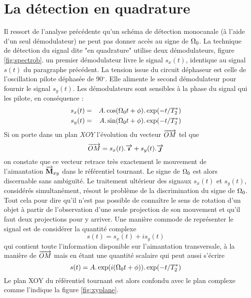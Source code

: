 \section{La détection en quadrature}
Il ressort de l'analyse précédente qu'un schéma de détection monocanale (à
l'aide d'un seul démodulateur) ne peut pas donner accès au signe de $\Omega_0$.
La technique de détection du signal dite "en quadrature" utilise deux démodulateurs, 
figure \ref{fig:spectrob}.
un premier démodulateur livre le signal $s_x(t)$, 
identique au signal $s(t)$ du paragraphe précédent.
La tension issue du circuit déphaseur est celle de l'oscillation pilote déphasée de 90$^{\circ}$.
Elle alimente le second démodulateur pour fournir le signal $s_y(t)$.
Les démodulateurs sont sensibles à la phase du signal qui les pilote, en conséquence :
\begin{eqnarray}
s_x(t) & = & A . \cos(\Omega_0 t + \phi) . \exp(-t/T_2^*) \\
s_y(t) & = & A . \sin(\Omega_0 t + \phi) . \exp(-t/T_2^*)
\end{eqnarray}
Si on porte dans un plan $XOY$ l'évolution du vecteur $\overrightarrow{OM}$ tel que
\begin{equation}
\overrightarrow{OM} = s_x(t) . \overrightarrow{\boldsymbol{\imath}} + s_y(t) . \overrightarrow{\boldsymbol{\jmath}}
\end{equation}
on constate que ce vecteur retrace très exactement le mouvement de l'aimantation $\overrightarrow{\mathbf{M}}_{xy}$
dans le référentiel tournant.
Le signe de $\Omega_0$ est alors discernable sans ambiguïté.
Le traitement ultérieur des signaux $s_x(t)$ et $s_y(t)$, considérés simultanément, résout le
problème de la discrimination du signe de $\Omega_0$.
Tout cela pour dire qu'il n'est pas possible de connaître le sens de rotation d'un objet
à partir de l'observation d'une seule projection de son mouvement et qu'il faut
deux projections pour y arriver.
Une manière commode de représenter le signal est de considérer la quantité complexe
\begin{equation}
s(t) = s_x(t) + is_y(t)
\end{equation}
qui contient toute l'information disponible sur l'aimantation transversale, à la
manière de $\overrightarrow{OM}$ mais en étant une quantité scalaire qui peut aussi s'écrire
\begin{equation}
\label{signalcomplexe}
s(t) = A . \exp(i(\Omega_0 t + \phi)) . \exp(-t/T_2^*)
\end{equation}
Le plan XOY du référentiel tournant est alors confondu avec le plan complexe comme 
l'indique la figure \ref{fig:xyplane}.

